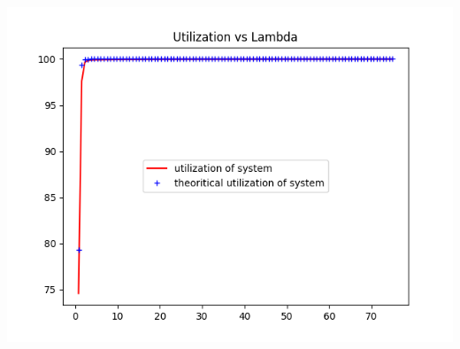 \documentclass[11pt]{article}
\begin{document}
 \includegraphics{Utilization_L100_K30_M25_U3}
 
\end{document}

